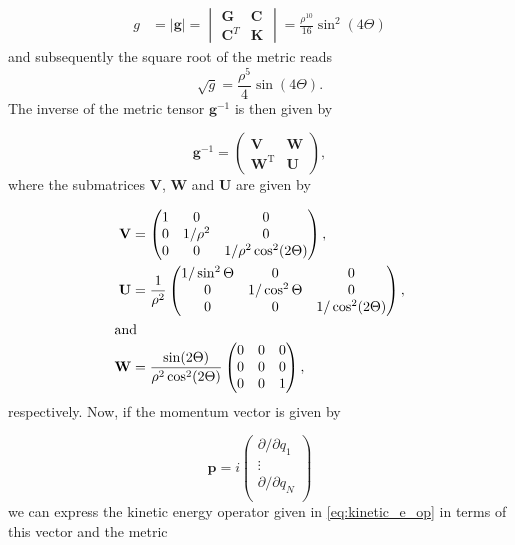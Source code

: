 \begin{align}
g &=
\mid\mathbf{g}\mid=
\begin{vmatrix}
\mathbf{G} & \mathbf{C}\\
\mathbf{C}^T & \mathbf{K}
\end{vmatrix}
=
\frac{\rho^{10}}{16}\sin^2(4\Theta)
\end{align}
and subsequently the square root of the metric reads
\begin{equation}
\sqrt{g}=\frac{\rho^5}{4}\sin(4\Theta).
\end{equation}
The inverse of the metric tensor $\mathbf{g}^{-1}$ is then given by

\begin{equation}
\mathbf{g}^{-1}=
\begin{pmatrix}
\mathbf{V} & \mathbf{W}\\
\mathbf{W}^\mathrm{T} & \mathbf{U}
\end{pmatrix},
\end{equation}
where the submatrices $\mathbf{V}$, $\mathbf{W}$ and $\mathbf{U}$ are given by

\begin{align}
\mathbf{V} &=
\begin{pmatrix}
1 & 0      & 0\\
0 & 1/\rho^2 & 0\\
0 & 0      & 1/\rho^2\cos^2(2\Theta)
\end{pmatrix},\\
\mathbf{U} &=
\frac{1}{\rho^2}
\begin{pmatrix}
1/\sin^2\Theta & 0            & 0\\
0            & 1/\cos^2\Theta & 0\\
0            & 0            & 1/\cos^2(2\Theta)
\end{pmatrix},\\
\intertext{and}
\mathbf{W} &=
\frac{\sin(2\Theta)}{\rho^2\cos^2(2\Theta)}
\begin{pmatrix}
0 & 0 & 0\\
0 & 0 & 0\\
0 & 0 & 1
\end{pmatrix},
\end{align}
respectively. Now, if the momentum vector is given by

\begin{equation}
\mathbf{p} = i 
\begin{pmatrix}
\partial/\partial q_1\\
\vdots\\
\partial/\partial q_N\\
\end{pmatrix}
\end{equation}
we can express the kinetic energy operator given in \eqref{eq:kinetic_e_op} in terms of this vector and the metric

